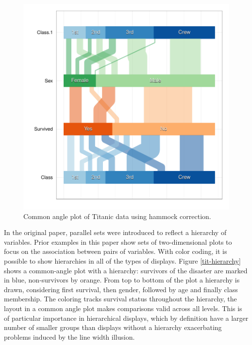 \documentclass[journal]{vgtc}\usepackage{graphicx, color}
\begin{document}
\begin{figure}[htbp]
\centering
\includegraphics[width=\linewidth]{images/adj-angle}
\caption{\label{adj.angle}Common angle plot of Titanic data using hammock correction.}
\end{figure}
In the original paper, parallel sets were introduced to reflect a hierarchy of variables. 
Prior examples in this paper show sets of two-dimensional plots to focus on the association between 
pairs of variables. 
With color coding, it is possible to show hierarchies in all of the types of displays.
Figure \ref{tit-hierarchy}
shows a common-angle plot  with a hierarchy: survivors of the disaster are marked in blue, 
non-survivors by orange. From top to bottom of the plot a hierarchy is drawn, considering first 
survival, then gender, followed by age and finally class membership. The coloring tracks 
survival status throughout the hierarchy, the layout in a common angle plot makes comparisons 
valid across all levels. This is of particular importance in hierarchical displays, which
by definition have a larger number of smaller groups than displays without a hierarchy exacerbating 
problems induced by the line width illusion.
\end{document}
